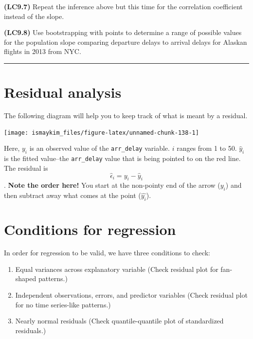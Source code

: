 \documentclass[]{tufte-book}
\let\oldrule=\rule
\renewcommand{\rule}[1]{\oldrule{\linewidth}}
\providecommand{\tightlist}{%
  \setlength{\itemsep}{0pt}\setlength{\parskip}{0pt}}
\begin{document}
\textbf{(LC9.7)} Repeat the inference above but this time for the
correlation coefficient instead of the slope.

\textbf{(LC9.8)} Use bootstrapping with points to determine a range of
possible values for the population slope comparing departure delays to
arrival delays for Alaskan flights in 2013 from NYC.

\begin{center}\rule{0.5\linewidth}{\linethickness}\end{center}

\section{Residual analysis}\label{resid}

The following diagram will help you to keep track of what is meant by a
residual.

\begin{center}\texttt{[image: ismaykim\_files/figure-latex/unnamed-chunk-138-1]} \end{center}

Here, \(y_i\) is an observed value of the \texttt{arr\_delay} variable.
\(i\) ranges from 1 to 50. \(\hat{y}_i\) is the fitted value--the
\texttt{arr\_delay} value that is being pointed to on the red line. The
residual is \[\hat{\epsilon}_i = y_i - \hat{y}_i\]. \textbf{Note the
order here!} You start at the non-pointy end of the arrow (\(y_i\)) and
then subtract away what comes at the point (\(\hat{y_i}\)).

\section{Conditions for regression}\label{conditions-for-regression}

In order for regression to be valid, we have three conditions to check:

\begin{enumerate}
\def\labelenumi{\arabic{enumi}.}
\tightlist
\item
  Equal variances across explanatory variable (Check residual plot for
  fan-shaped patterns.)
\item
  Independent observations, errors, and predictor variables (Check
  residual plot for no time series-like patterns.)
\item
  Nearly normal residuals (Check quantile-quantile plot of standardized
  residuals.)
\end{enumerate}
\end{document}
